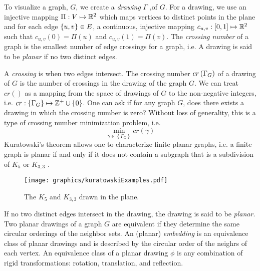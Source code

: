 To visualize a graph, $G$, we create a \textit{drawing} $\Gamma$ ,of $G$.  
For a drawing, we use an injective mapping $\Pi : V \mapsto {\mathbb{R}}^{2}$ which maps vertices to distinct points in the plane and for each edge $\left\lbrace u,v \right\rbrace \in E$, a continuous, injective mapping $c_{u,v}:[0,1]\mapsto {\mathbb{R}}^2$ such that $c_{u,v}(0) = \Pi(u)$ and $c_{u,v}(1) = \Pi(v)$. 
The \textit{crossing number} of a graph is the smallest number of edge crossings for a graph, i.e.
A drawing is said to be \textit{planar} if no two distinct edges.


A \textit{crossing} is when two edges intersect.  
The crossing number $cr\left( \Gamma_G \right)$ of a drawing of $G$ is the number of crossings in the drawing of the graph $G$. 
We can treat $cr()$ as a mapping from the space of drawings of $G$ to the non-negative integers, i.e. $cr: \left\lbrace \Gamma_G \right\rbrace \mapsto {\mathbb{Z}}^+ \cup \left\lbrace 0 \right\rbrace$.
One can ask if for any graph $G$, does there exists a drawing in which the crossing number is zero?
Without loss of generality, this is a type of crossing number minimization problem, i.e.
$$ \min_{\gamma \in \left\lbrace \Gamma_G \right\rbrace} cr(\gamma)$$
Kuratowski's theorem allows one to characterize finite planar graphs, i.e. a finite graph is planar if and only if it does not contain a subgraph that is a subdivision of $K_5$ or $K_{3,3}$ \cite{kuratowski1930probleme}. 
\begin{figure}[!htbp]
\begin{center}
\texttt{[image: graphics/kuratowskiExamples.pdf]}
\caption{The $K_5$ and $K_{3,3}$ drawn in the plane.}\label{fig:kuratowskiExamples.pdf}
\end{center} 
\end{figure} 
If no two distinct edges intersect in the drawing, the drawing is said to be \textit{planar}.  
Two planar drawings of a graph $G$ are equivalent if they determine the same circular orderings of the neighbor sets.
An (planar) \textit{embedding} is an equivalence class of planar drawings and is described by the circular order of the neighrs of each vertex.
An equivalence class of a planar drawing $\phi$ is any combination of rigid transformations: rotation, translation, and reflection.  







